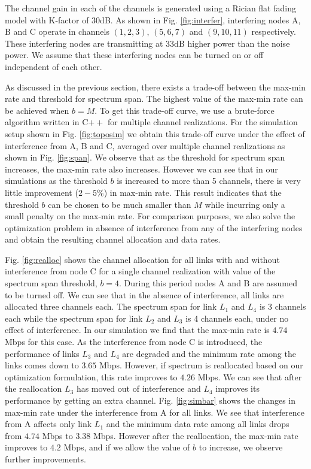 \documentclass[conference]{IEEEtran}
\begin{document}
The channel gain in each of the channels is generated using a Rician flat fading model with K-factor of 30dB. As shown in Fig. \ref{fig:interfer}, interfering nodes A, B and C operate in channels $(1,2,3)$, $(5, 6, 7)$ and $(9,10,11)$ respectively. These interfering nodes are transmitting at 33dB higher power than the noise power. We assume that these interfering nodes can be turned on or off independent of each other. 

As discussed in the previous section, there exists a trade-off between the max-min rate and threshold for spectrum span. The highest value of the max-min rate can be achieved when $b=M$. To get this trade-off curve, we use a brute-force algorithm written in C$++$ for multiple channel realizations.  For the simulation setup shown in Fig. \ref{fig:toposim} we obtain  this trade-off curve under the effect of interference from A, B and C, averaged over multiple channel realizations as shown in Fig. \ref{fig:span}. We observe that as the threshold for spectrum span increases, the max-min rate also increases. However we can see that in our simulations  as the threshold $b$ is increased to more than 5 channels, there is very little improvement ($2-5\%$) in max-min rate. This result indicates that the threshold $b$ can be chosen to be much smaller than $M$ while incurring only a small penalty on the max-min rate. 
For comparison purposes, we also solve the optimization problem in absence of interference from any of the interfering nodes and obtain the resulting  channel allocation and data rates.


Fig. \ref{fig:realloc} shows the channel allocation for all links with and without interference from node C for a single channel realization with value of the spectrum span threshold, $b=4$. During this period nodes A and B are assumed to be turned off.  We can see that in the absence of interference, all links are allocated three channels each. The spectrum span for link $L_1$ and $L_4$ is 3 channels each while the spectrum span for link $L_2$ and $L_3$ is 4 channels each, under no effect of interference. In our simulation we find that the max-min rate is $4.74$ Mbps for this case. As the interference from node C is introduced, the performance of links $L_3$ and $L_4$ are degraded and the minimum rate among the links comes down to $3.65$ Mbps. However, if spectrum is reallocated based on our optimization formulation, this rate improves to $4.26$ Mbps. We can see that after the reallocation $L_3$ has moved out of interference and $L_4$ improves its performance by getting an extra channel. Fig. \ref{fig:simbar} shows the changes in max-min rate under the interference from A for all links. We see that interference from A affects only link $L_1$ and the minimum data rate among all links drops from $4.74$ Mbps to $3.38$ Mbps. However after the reallocation, the max-min rate improves to $4.2$ Mbps, and if we allow the value of $b$ to increase, we observe further improvements. 
\end{document}
